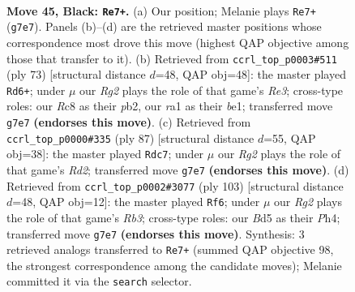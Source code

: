 \documentclass[11pt]{article}
\begin{document}
\clearpage

\begin{figure}[p]\centering
\begin{subfigure}{0.46\textwidth}\centering
\resizebox{\linewidth}{!}{%
\newchessgame
\chessboard[
  setfen={2r1k3/p1p3r1/P1p3p1/2Pb1p1p/1P3P1P/6R1/8/RN2K3 b Q - 13 45},
  showmover=false,
  pgfstyle=straightmove, color=movearrow, markmove={g7-e7}
]}
\caption{}
\end{subfigure}\hfill
\begin{subfigure}{0.46\textwidth}\centering
\resizebox{\linewidth}{!}{%
\newchessgame
\chessboard[
  setfen={8/b3k3/2p1r1p1/4ppPp/P6P/3K1P2/1P2R3/4B3 b - - 6 37},
  showmover=false,
  pgfstyle=straightmove, color=movearrow, markmove={e6-d6}
]}
\caption{}
\end{subfigure}
\\[4pt]
\begin{subfigure}{0.46\textwidth}\centering
\resizebox{\linewidth}{!}{%
\newchessgame
\chessboard[
  setfen={1kr5/3r2p1/1p1p1p2/1P2pP1P/2P1P3/1K6/7R/3R4 b - - 2 44},
  showmover=false,
  pgfstyle=straightmove, color=movearrow, markmove={d7-c7}
]}
\caption{}
\end{subfigure}\hfill
\begin{subfigure}{0.46\textwidth}\centering
\resizebox{\linewidth}{!}{%
\newchessgame
\chessboard[
  setfen={6r1/R2R4/pr4k1/1p2p1p1/1Pp1P1Pp/2P4P/3K4/8 b - - 4 52},
  showmover=false,
  pgfstyle=straightmove, color=movearrow, markmove={b6-f6}
]}
\caption{}
\end{subfigure}
\caption{\textbf{Move 45, Black: \texttt{Re7+}.} (a) Our position; Melanie plays \texttt{Re7+} (\texttt{g7e7}). Panels (b)--(d) are the retrieved master positions whose correspondence most drove this move (highest QAP objective among those that transfer to it). (b) Retrieved from \texttt{ccrl\_top\_p0003\#511} (ply 73) [structural distance $d$=48, QAP obj=48]: the master played \texttt{Rd6+}; under $\mu$ our \emph{Rg2} plays the role of that game's \emph{Re3}; cross-type roles: our \emph{R}c8 as their \emph{p}b2, our \emph{r}a1 as their \emph{b}e1; transferred move \texttt{g7e7} \textbf{(endorses this move)}. (c) Retrieved from \texttt{ccrl\_top\_p0000\#335} (ply 87) [structural distance $d$=55, QAP obj=38]: the master played \texttt{Rdc7}; under $\mu$ our \emph{Rg2} plays the role of that game's \emph{Rd2}; transferred move \texttt{g7e7} \textbf{(endorses this move)}. (d) Retrieved from \texttt{ccrl\_top\_p0002\#3077} (ply 103) [structural distance $d$=48, QAP obj=12]: the master played \texttt{Rf6}; under $\mu$ our \emph{Rg2} plays the role of that game's \emph{Rb3}; cross-type roles: our \emph{B}d5 as their \emph{P}h4; transferred move \texttt{g7e7} \textbf{(endorses this move)}. Synthesis: 3 retrieved analogs transferred to \texttt{Re7+} (summed QAP objective 98, the strongest correspondence among the candidate moves); Melanie committed it via the \texttt{search} selector.}
\label{fig:thought-m89}
\end{figure}
\end{document}
